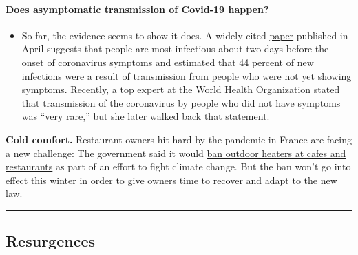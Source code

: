 \begin{itemize}
{  \paragraph{Does asymptomatic transmission of Covid-19
  happen?}\label{does-asymptomatic-transmission-of-covid-19-happen}}

  \begin{itemize}
  \tightlist
  \item
    So far, the evidence seems to show it does. A widely cited
    \href{https://www.nature.com/articles/s41591-020-0869-5}{paper}
    published in April suggests that people are most infectious about
    two days before the onset of coronavirus symptoms and estimated that
    44 percent of new infections were a result of transmission from
    people who were not yet showing symptoms. Recently, a top expert at
    the World Health Organization stated that transmission of the
    coronavirus by people who did not have symptoms was ``very rare,''
    \href{https://www.nytimes.com/2020/06/09/world/coronavirus-updates.html?action=click\&pgtype=Article\&state=default\&region=MAIN_CONTENT_3\&context=storylines_faq\#link-1f302e21}{but
    she later walked back that statement.}
  \end{itemize}
\end{itemize}

\textbf{Cold comfort.} Restaurant owners hit hard by the pandemic in
France are facing a new challenge: The government said it would
\href{https://www.nytimes.com/2020/07/28/world/europe/france-heated-terraces-coronavirus.html}{ban
outdoor heaters at cafes and restaurants} as part of an effort to fight
climate change. But the ban won't go into effect this winter in order to
give owners time to recover and adapt to the new law.

\begin{center}\rule{0.5\linewidth}{\linethickness}\end{center}

\hypertarget{resurgences}{%
\subsection{Resurgences}\label{resurgences}}

